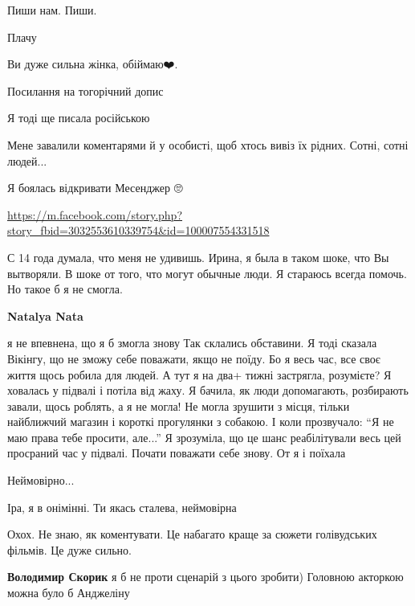 
Пиши нам. Пиши.


Плачу


Ви дуже сильна жінка, обіймаю❤️.


Посилання на тогорічний допис

Я тоді ще писала російською

Мене завалили коментарями й у особисті, щоб хтось вивіз їх рідних. Сотні, сотні людей...

Я боялась відкривати Месенджер 🙄

\url{https://m.facebook.com/story.php?story_fbid=3032553610339754&id=100007554331518}


С 14 года думала, что меня не удивишь. Ирина, я была в таком шоке, что Вы
вытворяли. В шоке от того, что могут обычные люди.  Я стараюсь всегда помочь.
Но такое б я не смогла.

\begin{itemize} %
\textbf{Natalya Nata} 

\obeycr
я не впевнена, що я б змогла знову
Так склались обставини.
Я тоді сказала Вікінгу, що не зможу себе поважати, якщо не поїду.
Бо я весь час, все своє життя щось робила для людей. А тут я на два+ тижні застрягла, розумієте? Я ховалась у підвалі і потіла від жаху. Я бачила, як люди допомагають, розбирають завали, щось роблять, а я не могла! Не могла зрушити з місця, тільки найближчий магазин і короткі прогулянки з собакою.
І коли прозвучало: \enquote{Я не маю права тебе просити, але...}
Я зрозуміла, що це шанс реабілітували весь цей просраний час у підвалі.
Почати поважати себе знову.
От я і поїхала
\restorecr
\end{itemize} %


Неймовірно...


Іра, я в онімінні. Ти якась сталева, неймовірна


Охох. Не знаю, як коментувати. Це набагато краще за сюжети голівудських фільмів. Це дуже сильно.

\begin{itemize} %
\textbf{Володимир Скорик} я б не проти сценарій з цього зробити)
Головною акторкою можна було б Анджеліну 🤩
\end{itemize} %

